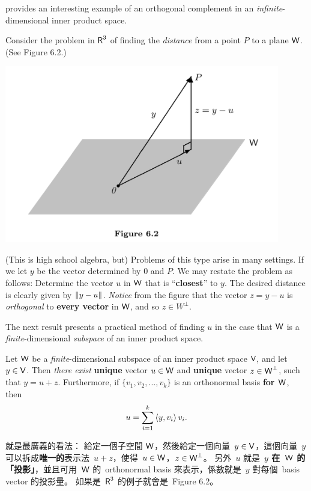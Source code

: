  provides an interesting example of an orthogonal complement in an \emph{infinite}-dimensional inner product space. 
\begin{remark} \label{remark 6.2.7}
Consider the problem in \(\textsf{R}^3\) of finding the \emph{distance} from a point \(P\) to a plane \(\textsf{W}\).
(See Figure 6.2.)

\includegraphics[width=12cm]{images/figure-6-2.png}

(This is high school algebra, but) Problems of this type arise in many settings.
If we let \(y\) be the vector determined by \(0\) and \(P\).
We may restate the problem as follows:
Determine the vector \(u\) in \(\textsf{W}\) that is ``\textbf{closest}'' to \(y\).
The desired distance is clearly given by \(\left\lVert y - u\right\rVert\).
\emph{Notice} from the figure that the vector \(z = y - u\) is \emph{orthogonal} to \textbf{every vector} in \(\textsf{W}\), and so \(z \in W^{\perp}\).

The next result presents a practical method of finding \(u\) in the case that \(\textsf{W}\) is a \emph{finite}-dimensional \emph{subspace} of an inner product space.
\end{remark}

\begin{theorem} \label{thm 6.6}
Let \(\textsf{W}\) be a \emph{finite}-dimensional subspace of an inner product space \(\textsf{V}\), and let \(y \in \textsf{V}\).
Then \emph{there exist} \textbf{unique} vector \(u \in \textsf{W}\) and \textbf{unique} vector \(z \in \textsf{W}^{\perp}\), such that \(y = u + z\).
Furthermore, if \(\{ v_1, v_2, ..., v_k \}\) is an orthonormal basis \textbf{for \(\textsf{W}\)}, then
\[
    u = \sum_{i = 1}^k \left< y, v_i \right> v_i.
\]
\end{theorem}

\begin{note}
 就是最廣義的看法：
給定一個子空間 \(\textsf{W}\)，然後給定一個向量\ \(y \in \textsf{V}\)，這個向量\ \(y\) 可以拆成\textbf{唯一的}表示法\ \(u + z\)，使得\ \(u \in \textsf{W}\)，\(z \in \textsf{W}^{\perp}\)。
另外\ \(u\) 就是\ \textbf{\(y\) 在\ \(\textsf{W}\) 的「投影」}，並且可用\ \(\textsf{W}\) 的\ orthonormal basis 來表示，係數就是\ \(y\) 對每個\ basis vector 的投影量。
如果是\ \(\textsf{R}^3\) 的例子就會是\ Figure 6.2。
\end{note}


